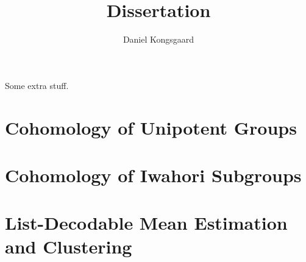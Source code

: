 \documentclass[letterpaper,oneside,english,11pt,openany]{memoir}
\title{Dissertation}
\author{Daniel Kongsgaard}
\begin{document}
\DoubleSpacing


\frontmatter



\tableofcontents*

\clearpage

\begin{vplace}[0.7]
  Some extra stuff.
\end{vplace}

\clearpage

\mainmatter

\chapter{Cohomology of Unipotent Groups}%
\label{cha:cohunigps}



\chapter{Cohomology of Iwahori Subgroups}%
\label{cha:cohiwagps}



\chapter{List-Decodable Mean Estimation and Clustering}%
\label{cha:robstat}



\clearpage

\backmatter

\printbibliography

\clearpage

\printnomenclature[4cm]

\clearpage

\printindex
\end{document}
